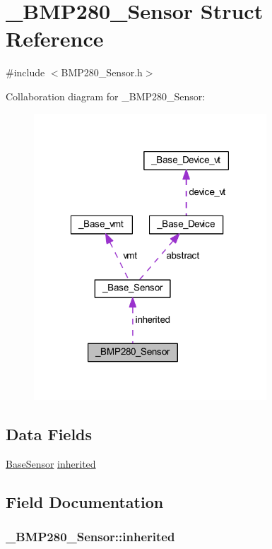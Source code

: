 \hypertarget{struct___b_m_p280___sensor}{\section{\-\_\-\-B\-M\-P280\-\_\-\-Sensor Struct Reference}
\label{struct___b_m_p280___sensor}
}


{\ttfamily \#include $<$B\-M\-P280\-\_\-\-Sensor.\-h$>$}



Collaboration diagram for \-\_\-\-B\-M\-P280\-\_\-\-Sensor\-:
\nopagebreak
\begin{figure}[H]
\begin{center}
\leavevmode
\includegraphics[width=247pt]{struct___b_m_p280___sensor__coll__graph}
\end{center}
\end{figure}
\subsection*{Data Fields}
\begin{DoxyCompactItemize}
\item 
\hyperlink{_base___sensor_8h_ae91aa07b7bce6c6b463d63d8f214bb37}{Base\-Sensor} \hyperlink{struct___b_m_p280___sensor_a35781d57029c477ad5c22cdbcce55e71}{inherited}
\end{DoxyCompactItemize}


\subsection{Field Documentation}
\hypertarget{struct___b_m_p280___sensor_a35781d57029c477ad5c22cdbcce55e71}{
\subsubsection[{inherited}]{ \-\_\-\-B\-M\-P280\-\_\-\-Sensor\-::inherited}}\label{struct___b_m_p280___sensor_a35781d57029c477ad5c22cdbcce55e71}


